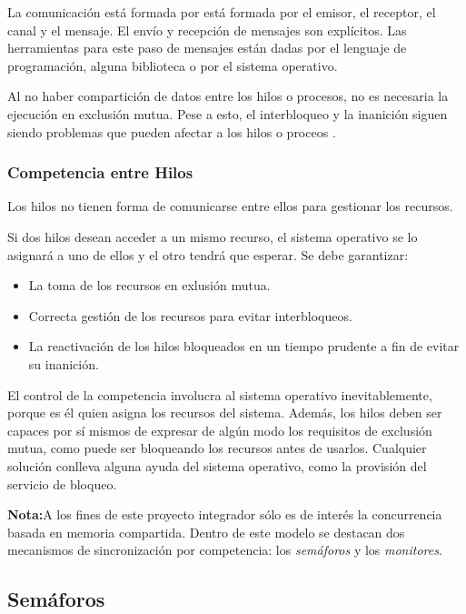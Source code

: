 La comunicación está formada por está formada por el emisor, el receptor, el
canal y el mensaje. El envío y recepción de mensajes son explícitos.
Las herramientas para este paso de mensajes están dadas por el lenguaje de
programación, alguna biblioteca o por el sistema operativo.

Al no haber compartición de datos entre los hilos o procesos, no es necesaria la
ejecución en exclusión mutua. Pese a esto, el interbloqueo y la inanición siguen
siendo problemas que pueden afectar a los hilos o proceos
\cite{SistOpStallings}.

\subsubsection{Competencia entre Hilos}

Los hilos no tienen forma de comunicarse entre ellos para gestionar los
recursos.

Si dos hilos desean acceder a un mismo recurso, el sistema operativo se lo
asignará a uno de ellos y el otro tendrá que esperar. Se debe garantizar:
\begin{itemize}
    \item La toma de los recursos en exlusión mutua.
    \item Correcta gestión de los recursos para evitar interbloqueos.
    \item La reactivación de los hilos bloqueados en un tiempo prudente a fin de
    evitar su inanición.
\end{itemize}
El control de la competencia involucra al sistema operativo
inevitablemente, porque es él quien asigna los recursos del sistema.
Además, los hilos deben ser capaces por sí mismos de expresar de algún
modo los requisitos de exclusión mutua, como puede ser bloqueando los
recursos antes de usarlos. Cualquier solución conlleva alguna ayuda del
sistema operativo, como la provisión del servicio de
bloqueo.\cite{SistOpStallings}

\begin{framed}
\textbf{Nota:}A los fines de este proyecto integrador sólo es de interés la
concurrencia basada en memoria compartida. Dentro de este modelo se destacan dos
mecanismos de sincronización por competencia: los \textit{semáforos} y los
\textit{monitores}.
\end{framed}

\subsection{Semáforos}
\label{semaforos}

